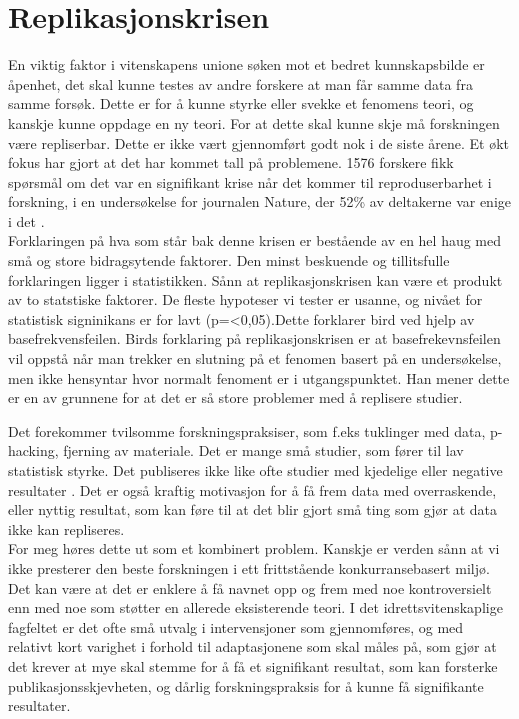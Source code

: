 \documentclass[
]{book}
\begin{document}
\hypertarget{replikasjonskrisen}{%
\section{Replikasjonskrisen}\label{replikasjonskrisen}}

En viktig faktor i vitenskapens unione søken mot et bedret kunnskapsbilde er åpenhet, det skal kunne testes av andre forskere at man får samme data fra samme forsøk. Dette er for å kunne styrke eller svekke et fenomens teori, og kanskje kunne oppdage en ny teori. For at dette skal kunne skje må forskningen være repliserbar. Dette er ikke vært gjennomført godt nok i de siste årene. Et økt fokus har gjort at det har kommet tall på problemene. 1576 forskere fikk spørsmål om det var en signifikant krise når det kommer til reproduserbarhet i forskning, i en undersøkelse for journalen Nature, der 52\% av deltakerne var enige i det \citep{Baker2016}.\\

Forklaringen på hva som står bak denne krisen er bestående av en hel haug med små og store bidragsytende faktorer. Den minst beskuende og tillitsfulle forklaringen ligger i statistikken. Sånn at replikasjonskrisen kan være et produkt av to statstiske faktorer. De fleste hypoteser vi tester er usanne, og nivået for statistisk signinikans er for lavt (p=\textless0,05).Dette forklarer bird ved hjelp av basefrekvensfeilen. Birds forklaring på replikasjonskrisen er at basefrekevnsfeilen vil oppstå når man trekker en slutning på et fenomen basert på en undersøkelse, men ikke hensyntar hvor normalt fenoment er i utgangspunktet. Han mener dette er en av grunnene for at det er så store problemer med å replisere studier.

Det forekommer tvilsomme forskningspraksiser, som f.eks tuklinger med data, p-hacking, fjerning av materiale. Det er mange små studier, som fører til lav statistisk styrke. Det publiseres ikke like ofte studier med kjedelige eller negative resultater \citep{bird2020}. Det er også kraftig motivasjon for å få frem data med overraskende, eller nyttig resultat, som kan føre til at det blir gjort små ting som gjør at data ikke kan repliseres\citep{romero2017}.\\

For meg høres dette ut som et kombinert problem. Kanskje er verden sånn at vi ikke presterer den beste forskningen i ett frittstående konkurransebasert miljø. Det kan være at det er enklere å få navnet opp og frem med noe kontroversielt enn med noe som støtter en allerede eksisterende teori. I det idrettsvitenskaplige fagfeltet er det ofte små utvalg i intervensjoner som gjennomføres, og med relativt kort varighet i forhold til adaptasjonene som skal måles på, som gjør at det krever at mye skal stemme for å få et signifikant resultat, som kan forsterke publikasjonsskjevheten, og dårlig forskningspraksis for å kunne få signifikante resultater.
\end{document}
